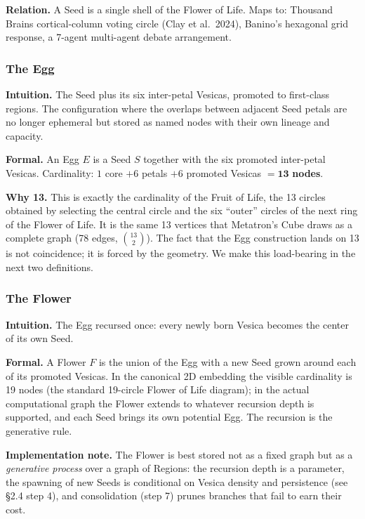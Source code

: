 \documentclass[11pt,a4paper]{article}
\begin{document}
\textbf{Relation.} A Seed is a single shell of the Flower of Life. Maps to: Thousand Brains cortical-column voting circle (Clay et al.\ 2024), Banino's hexagonal grid response, a 7-agent multi-agent debate arrangement.

\subsubsection*{The Egg}

\textbf{Intuition.} The Seed plus its six inter-petal Vesicas, promoted to first-class regions. The configuration where the overlaps between adjacent Seed petals are no longer ephemeral but stored as named nodes with their own lineage and capacity.

\textbf{Formal.} An Egg $E$ is a Seed $S$ together with the six promoted inter-petal Vesicas. Cardinality: $1$ core $+ 6$ petals $+ 6$ promoted Vesicas $= \mathbf{13}$ \textbf{nodes}.

\textbf{Why 13.} This is exactly the cardinality of the Fruit of Life, the 13 circles obtained by selecting the central circle and the six ``outer'' circles of the next ring of the Flower of Life. It is the same 13 vertices that Metatron's Cube draws as a complete graph (78 edges, $\binom{13}{2}$). The fact that the Egg construction lands on 13 is not coincidence; it is forced by the geometry. We make this load-bearing in the next two definitions.

\subsubsection*{The Flower}

\textbf{Intuition.} The Egg recursed once: every newly born Vesica becomes the center of its own Seed.

\textbf{Formal.} A Flower $F$ is the union of the Egg with a new Seed grown around each of its promoted Vesicas. In the canonical 2D embedding the visible cardinality is 19 nodes (the standard 19-circle Flower of Life diagram); in the actual computational graph the Flower extends to whatever recursion depth is supported, and each Seed brings its own potential Egg. The recursion is the generative rule.

\textbf{Implementation note.} The Flower is best stored not as a fixed graph but as a \emph{generative process} over a graph of Regions: the recursion depth is a parameter, the spawning of new Seeds is conditional on Vesica density and persistence (see \S 2.4 step 4), and consolidation (step 7) prunes branches that fail to earn their cost.
\end{document}
